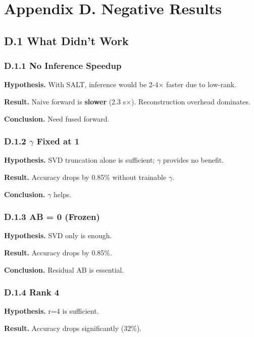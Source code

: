 
\section{Appendix D. Negative Results}

\subsection{D.1 What Didn't Work}

\subsubsection{D.1.1 No Inference Speedup}

\textbf{Hypothesis.} With SALT, inference would be 2-4$\times$ faster due to low-rank.

\textbf{Result.} Naive forward is \textbf{slower} (2.3 s$\times$). Reconstruction 
overhead dominates.

\textbf{Conclusion.} Need fused forward.

\subsubsection{D.1.2 $\gamma$ Fixed at 1}

\textbf{Hypothesis.} SVD truncation alone is sufficient; $\gamma$ provides no benefit.

\textbf{Result.} Accuracy drops by 0.85\% without trainable $\gamma$.

\textbf{Conclusion.} $\gamma$ helps.

\subsubsection{D.1.3 AB = 0 (Frozen)}

\textbf{Hypothesis.} SVD only is enough.

\textbf{Result.} Accuracy drops by 0.85\%.

\textbf{Conclusion.} Residual AB is essential.

\subsubsection{D.1.4 Rank 4}

\textbf{Hypothesis.} r=4 is sufficient.

\textbf{Result.} Accuracy drops significantly (32\%).


